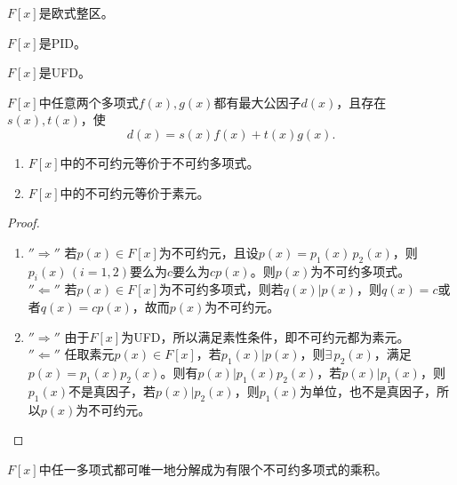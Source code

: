 \begin{theorem}
	$F[x]$是欧式整区。
\end{theorem}

\begin{corollary}
	$F[x]$是PID。
\end{corollary}

\begin{corollary}
	$F[x]$是UFD。
\end{corollary}

\begin{corollary}
	$F[x]$中任意两个多项式$f(x),g(x)$都有最大公因子$d(x)$，且存在$s(x),t(x)$，使
	\begin{equation*}
		d(x)=s(x)f(x)+t(x)g(x).
	\end{equation*}
\end{corollary}
\par
{}
\begin{proposition}
	\begin{enumerate}
		\item $F[x]$中的不可约元等价于不可约多项式。
		\item $F[x]$中的不可约元等价于素元。
	\end{enumerate}
\end{proposition}
\begin{proof}
	\begin{enumerate}
		\item $''\Rightarrow''$ 若$p(x)\in F[x]$为不可约元，且设$p(x)=p_{1}(x)\, p_{2}(x)$，则$p_{i}(x)\, (i=1,2)$要么为$c$要么为$cp(x)$。则$p(x)$为不可约多项式。\\
		$''\Leftarrow''$ 若$p(x)\in F[x]$为不可约多项式，则若$q(x)\Big| p(x)$，则$q(x)=c$或者$q(x)=cp(x)$，故而$p(x)$为不可约元。
		\item $''\Rightarrow''$ 由于$F[x]$为UFD，所以满足素性条件，即不可约元都为素元。\\
		$''\Leftarrow''$ 任取素元$p(x)\in F[x]$，若$p_{1}(x)\Big| p(x)$，则$\exists \, p_{2}(x)$，满足$p(x)=p_{1}(x)p_{2}(x)$。则有$p(x)\Big| p_{1}(x)p_{2}(x)$，若$p(x)\Big | p_{1}(x)$，则$p_{1}(x)$不是真因子，若$p(x)\Big | p_{2}(x)$，则$p_{1}(x)$为单位，也不是真因子，所以$p(x)$为不可约元。
	\end{enumerate}
\end{proof}
\begin{corollary}
	$F[x]$中任一多项式都可唯一地分解成为有限个不可约多项式的乘积。
\end{corollary}

